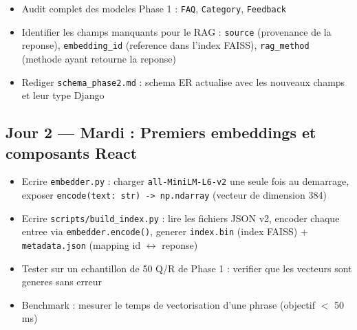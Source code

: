 \documentclass[11pt,a4paper]{article}
\begin{document}
\begin{dbbox}
\begin{itemize}
    \item[$\square$] Audit complet des modeles Phase 1 : \texttt{FAQ}, \texttt{Category}, \texttt{Feedback}
    \item[$\square$] Identifier les champs manquants pour le RAG : \texttt{source} (provenance de la reponse), \texttt{embedding\_id} (reference dans l'index FAISS), \texttt{rag\_method} (methode ayant retourne la reponse)
    \item[$\square$] Rediger \texttt{schema\_phase2.md} : schema ER actualise avec les nouveaux champs et leur type Django
\end{itemize}
\end{dbbox}

\subsection{Jour 2 --- Mardi : Premiers embeddings et composants React}

\begin{ragbox}[Backend --- J2]
\begin{itemize}
    \item[$\square$] Ecrire \texttt{embedder.py} : charger \texttt{all-MiniLM-L6-v2} une seule fois au demarrage, exposer \texttt{encode(text: str) -> np.ndarray} (vecteur de dimension 384)
    \item[$\square$] Ecrire \texttt{scripts/build\_index.py} : lire les fichiers JSON v2, encoder chaque entree via \texttt{embedder.encode()}, generer \texttt{index.bin} (index FAISS) + \texttt{metadata.json} (mapping id $\leftrightarrow$ reponse)
    \item[$\square$] Tester sur un echantillon de 50 Q/R de Phase 1 : verifier que les vecteurs sont generes sans erreur
    \item[$\square$] Benchmark : mesurer le temps de vectorisation d'une phrase (objectif $<$ 50 ms)
\end{itemize}
\end{ragbox}
\end{document}
